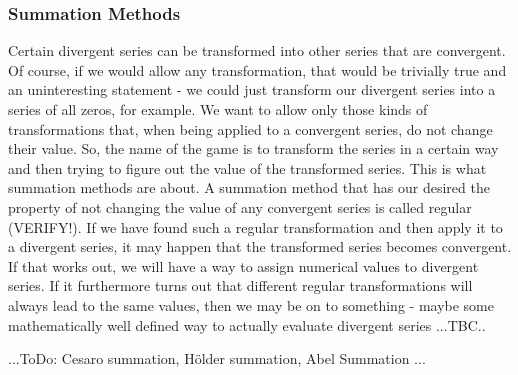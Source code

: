 \subsubsection{Summation Methods} Certain divergent series can be transformed into other series that are convergent. Of course, if we would allow any transformation, that would be trivially true and an uninteresting statement - we could just transform our divergent series into a series of all zeros, for example. We want to allow only those kinds of transformations that, when being applied to a convergent series, do not change their value. So, the name of the game is to transform the series in a certain way and then trying to figure out the value of the transformed series. This is what summation methods are about. A summation method that has our desired the property of not changing the value of any convergent series is called regular (VERIFY!). If we have found such a regular transformation and then apply it to a divergent series, it may happen that the transformed series becomes convergent. If that works out, we will have a way to assign numerical values to divergent series. If it furthermore turns out that different regular transformations will always lead to the same values, then we may be on to something - maybe some mathematically well defined way to actually evaluate divergent series ...TBC..





% 


...ToDo: Cesaro summation, Hölder summation, Abel Summation ...


